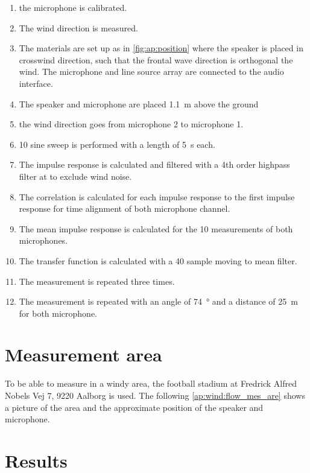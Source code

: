 \begin{enumerate}
\item the microphone is calibrated.
\item The wind direction is measured.
\item The materials are set up as in \autoref{fig:ap:position} where the speaker is placed in crosswind direction, such that the frontal wave direction is orthogonal the wind. The microphone and line source array are connected to the audio interface.
\item The speaker and microphone are placed \SI{1.1}{\meter} above the ground
\item the wind direction goes from microphone 2 to microphone 1.
\item 10 sine sweep is performed with a length of \SI{5}{\second} each. 
\item The impulse response is calculated and filtered with a 4th order highpass filter at  to exclude wind noise.
\item The correlation is calculated for each impulse response to the first impulse response for time alignment \citep{gunness2001loudspeaker} of both microphone channel.
\item The mean impulse response is calculated for the 10 measurements of both microphones.
\item The transfer function is calculated with a 40 sample moving to mean filter.
\item The measurement is repeated three times.
\item The measurement is repeated with an angle of \SI{74}{\degree} and a distance of \SI{25}{\meter} for both microphone.
\end{enumerate}


\section*{Measurement area}
To be able to measure in a windy area, the football stadium at Fredrick Alfred Nobels Vej 7, 9220 Aalborg is used. The following \autoref{ap:wind:flow_mes_are} shows a picture of the area and the approximate position of the speaker and microphone.


\section*{Results}

